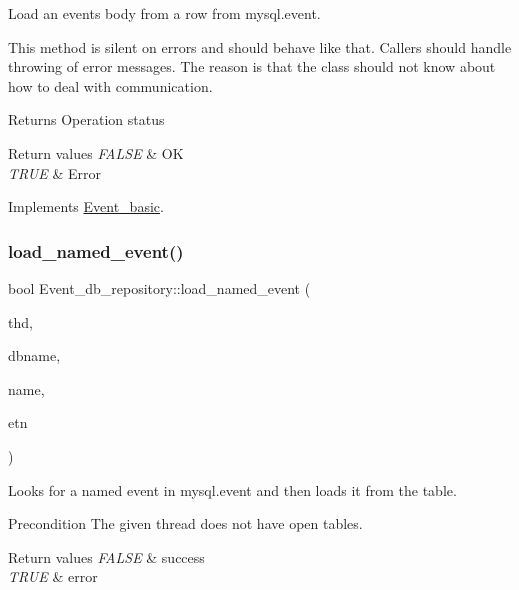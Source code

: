 Load an event\textquotesingle{}s body from a row from mysql.\+event.

This method is silent on errors and should behave like that. Callers should handle throwing of error messages. The reason is that the class should not know about how to deal with communication.

\begin{DoxyReturn}{Returns}
Operation status 
\end{DoxyReturn}

\begin{DoxyRetVals}{Return values}
{\em F\+A\+L\+SE} & OK \\
\hline
{\em T\+R\+UE} & Error \\
\hline
\end{DoxyRetVals}


Implements \mbox{\hyperlink{classEvent__basic}{Event\+\_\+basic}}.

\mbox{\label{group__Event__Scheduler_ga12847ce2627dee3ddb5d0b28d3bc4ba7}} 
\subsubsection{\texorpdfstring{load\+\_\+named\+\_\+event()}{load\_named\_event()}}
{\footnotesize\ttfamily bool Event\+\_\+db\+\_\+repository\+::load\+\_\+named\+\_\+event (\begin{DoxyParamCaption}\item[{T\+HD $\ast$}]{thd,  }\item[{L\+E\+X\+\_\+\+S\+T\+R\+I\+NG}]{dbname,  }\item[{L\+E\+X\+\_\+\+S\+T\+R\+I\+NG}]{name,  }\item[{\mbox{\hyperlink{classEvent__basic}{Event\+\_\+basic}} $\ast$}]{etn }\end{DoxyParamCaption})}

Looks for a named event in mysql.\+event and then loads it from the table.

\begin{DoxyPrecond}{Precondition}
The given thread does not have open tables.
\end{DoxyPrecond}

\begin{DoxyRetVals}{Return values}
{\em F\+A\+L\+SE} & success \\
\hline
{\em T\+R\+UE} & error \\
\hline
\end{DoxyRetVals}
\mbox{\label{group__Event__Scheduler_ga019f518dd8c841d910161407064682c1}} 
